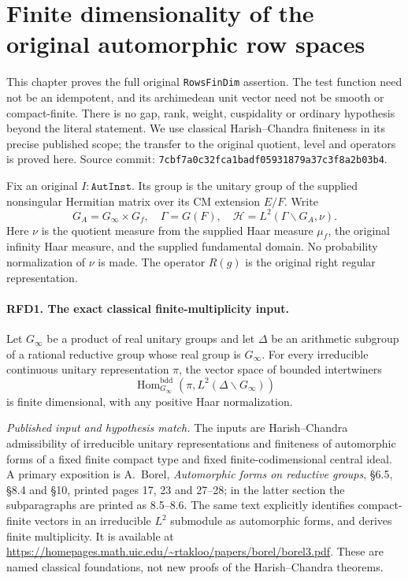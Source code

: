 \section{Finite dimensionality of the original automorphic row spaces}
\label{sec:row-finiteness-v47}

This chapter proves the full original \texttt{RowsFinDim} assertion.
The test function need not be an idempotent, and its archimedean unit
vector need not be smooth or compact-finite.  There is no gap, rank,
weight, cuspidality or ordinary hypothesis beyond the literal statement.
We use classical Harish--Chandra finiteness in its precise published
scope; the transfer to the original quotient, level and operators is
proved here.  Source commit:
\texttt{7cbf7a0c32fca1badf05931879a37c3f8a2b03b4}.

Fix an original \(I:\texttt{AutInst}\).  Its group is the unitary
group of the supplied nonsingular Hermitian matrix over its CM
extension \(E/F\).  Write
\[
 G_A=G_\infty\times G_f,
 \quad \Gamma=G(F),
 \quad \mathcal H=L^2(\Gamma\backslash G_A,\nu).
 \tag{RFD.1}
\]
Here \(\nu\) is the quotient measure from the supplied Haar measure
\(\mu_f\), the original infinity Haar measure, and the supplied
fundamental domain.  No probability normalization of \(\nu\) is made.
The operator \(R(g)\) is the original right regular representation.

\paragraph{RFD1. The exact classical finite-multiplicity input.}
\label{claim:RFD1}
Let \(G_\infty\) be a product of real unitary groups and let
\(\Delta\) be an arithmetic subgroup of a rational reductive group
whose real group is \(G_\infty\).  For every irreducible continuous
unitary representation \(\pi\), the vector space of bounded
intertwiners
\[
 \operatorname{Hom}^{\mathrm{bdd}}_{G_\infty}
       (\pi,L^2(\Delta\backslash G_\infty))
 \tag{RFD.2}
\]
is finite dimensional, with any positive Haar normalization.

\emph{Published input and hypothesis match.}
The inputs are Harish--Chandra admissibility of irreducible unitary
representations and finiteness of automorphic forms of a fixed finite
compact type and fixed finite-codimensional central ideal.  A primary
exposition is A.~Borel, \emph{Automorphic forms on reductive groups},
\S6.5, \S8.4 and \S10, printed pages 17, 23 and 27--28; in the latter section
the subparagraphs are printed as 8.5--8.6.  The same text explicitly
identifies compact-finite vectors in an irreducible \(L^2\) submodule
as automorphic forms, and derives finite multiplicity.  It is available at
\url{https://homepages.math.uic.edu/~rtakloo/papers/borel/borel3.pdf}.
These are named classical foundations, not new proofs of the
Harish--Chandra theorems.

